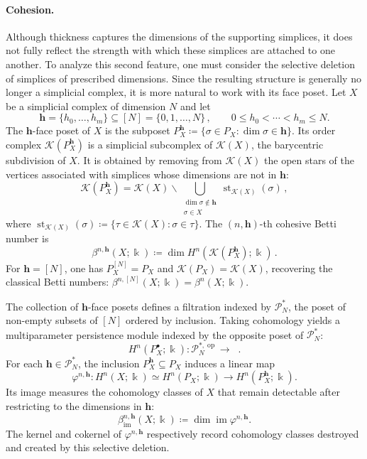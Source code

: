 \documentclass[reqno,12pt]{amsart}
\newcommand{\cP}{\mathcal{P}}
\DeclareMathOperator{\vect}{\mathbf{vect}_\Bbbk}
\DeclareMathOperator{\img}{im}
\DeclareMathOperator{\op}{op}
\DeclareMathOperator{\st}{st}
\newcommand{\0}{\mathbf 0}
\newcommand{\h}{\mathbf{h}}
\theoremstyle{definition}
\begin{document}
\paragraph{{\bf Cohesion.}}
Although thickness captures the dimensions of the supporting simplices, it does not fully reflect the strength with which these simplices are attached to one another. To analyze this second feature, one must consider the selective deletion of simplices of prescribed dimensions. Since the resulting structure is generally no longer a simplicial complex, it is more natural to work with its face poset. Let $X$ be a simplicial complex of dimension $N$ and let
\[
    \h=\{h_0,\dots,h_m\}\subseteq [N]=\{0,1,\dots,N\}\,,
    \qquad
    0\leq h_0<\cdots<h_m\leq N.
\]
The $\h$-face poset of $X$ is the subposet $P_X^\h \coloneqq \{\sigma\in P_X : \dim\sigma\in\h\}$. Its order complex $\mathcal{K}(P_X^\mathbf{h})$ is a simplicial subcomplex of $\mathcal{K}(X)$, the barycentric subdivision of $X$. It is obtained by removing from $\mathcal{K}(X)$ the open stars of the vertices associated with simplices whose dimensions are not in $\mathbf{h}$:
\[
\mathcal{K}(P_X^\mathbf{h}) = \mathcal{K}(X) \smallsetminus \bigcup_{\substack{\dim\sigma\notin\mathbf{h}\\ \sigma \in X}} \st_{\mathcal{K}(X)}(\sigma)\,,
\]
where $\st_{\mathcal{K}(X)}(\sigma) \coloneqq \{\tau \in \mathcal{K}(X) : \sigma \in \tau\}$. The $(n,\h)$-th cohesive Betti number is
\begin{equation}\label{Def:CohesiveBetti}
    \beta^{n,\h}(X;\Bbbk)
    \coloneqq
    \dim H^n(\mathcal{K}(P_X^\h);\Bbbk)\,.
\end{equation}
For $\h=[N]$, one has $P_X^{[N]}=P_X$ and $\mathcal{K}(P_X)=\mathcal{K}(X)$, recovering the classical Betti numbers: $\beta^{n,[N]}(X;\Bbbk)= \beta^n(X;\Bbbk)$.

The collection of $\h$-face posets defines a filtration indexed by $\cP^*_N$, the poset of non-empty subsets of $[N]$ ordered by inclusion. Taking cohomology yields a multiparameter persistence module indexed by the opposite poset of $\cP^*_N$:
\begin{equation}\label{Eq:CohesionModuleConstantSheaf}
        H^n(P_X^\bullet;\Bbbk)\colon
    \cP^{*,\op}_N
    \longrightarrow
    \vect.
\end{equation}
For each $\h\in\cP^*_N$, the inclusion $P_X^\h\subseteq P_X$ induces a linear map
\[
    \varphi^{n,\h}\colon
    H^n(X;\Bbbk)
    \simeq
    H^n(P_X;\Bbbk)
    \longrightarrow
    H^n(P_X^\h;\Bbbk).
\]
Its image measures the cohomology classes of $X$ that remain detectable after restricting to the dimensions in $\h$:
\[
    \beta_{\img}^{n,\h}(X;\Bbbk)
    \coloneqq
    \dim\img\varphi^{n,\h}.
\]
The kernel and cokernel of $\varphi^{n,\h}$ respectively record cohomology classes destroyed and created by this selective deletion.
\end{document}
